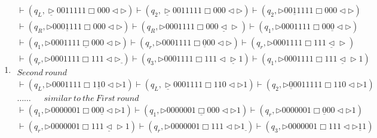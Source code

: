 \documentclass[12pt,a4paper]{article}
\makeatletter
\newtheorem*{solution}{Solution}
\theoremstyle{definition}
\renewenvironment{solution}[1][Solution] {\par\pushQED{\qed}\normalfont\topsep6\p@\@plus6\p@\relax\trivlist\item[\hskip\labelsep\bfseries#1\@addpunct{.}]\ignorespaces}{\popQED\endtrivlist\@endpefalse} \makeatother
\makeatother
\begin{document}
\begin{enumerate}
\begin{solution}
\begin{enumerate}
\begin{equation}
\begin{aligned}
	\vdash(q_L,\underline{\triangleright}  0 0    1  1  1  1  1 \Box 0  0  0    \triangleleft \triangleright )	\vdash(q_2,\underline{\triangleright}  0 0    1  1  1  1  1 \Box 0  0  0    \triangleleft \triangleright )	\vdash(q_2,\triangleright  0 0    \underline{1}  1  1  1  1 \Box 0  0  0    \triangleleft \triangleright )\\
		\vdash(q_R,\triangleright  0 0    0  \underline{1}  1  1  1 \Box 0  0  0    \triangleleft \triangleright )		\vdash(q_R,\triangleright  0 0    0  1  1  1  1 \Box 0  0  0    \underline{\triangleleft} \triangleright )		\vdash(q_1,\triangleright  0 0    0  1  1  1  1 \Box 0  0  \underline{0}    \triangleleft \triangleright )\\
	\vdash(q_1,\triangleright  0 0    0  1  1  1  1 \underline{\Box} 0  0  0    \triangleleft \triangleright )\vdash(q_r,\triangleright  0 0    0  1  1  1  1 \Box \underline{0}  0  0    \triangleleft \triangleright )\vdash(q_r,\triangleright  0 0    0  1  1  1  1 \Box 1 1 1    \underline{\triangleleft} \triangleright )\\
	\vdash(q_r,\triangleright  0 0 0  1  1  1  1 \Box 1 1 1    \triangleleft \triangleright \underline{~})\vdash(q_3,\triangleright  0 0 0  1  1  1  1 \Box 1 1 1    \triangleleft \underline{\triangleright} 1)\vdash(q_1,\triangleright  0 0 0  1  1  1  1 \Box 1 1 1    \underline{\triangleleft} \triangleright 1)\\
	Second~round~~~~~~~~~~~~~~~~~~~~~~~~~~~~~~~~~~~~~~~~~~~~~~~~~~~~~~~~~~~~~\\
	\vdash(q_L,\triangleright  0 0 0  1  1  1  1 \Box 1  \underline{1}  0    \triangleleft \triangleright 1)\vdash(q_L,\underline{\triangleright}  0 0 0  1  1  1  1 \Box 1  1  0    \triangleleft \triangleright 1)\vdash(q_2,\triangleright  \underline{0}  0 01  1  1  1  1 \Box 1  1  0    \triangleleft \triangleright 1)\\
	\dots\dots~~~~~~~similar~to~the~First~round~~~~~~~~~~~~~~~~~~~~~~~~~~~~~~~~~~~~~~~~~~~~\\
	\vdash(q_1,\triangleright  0 0 0  0  0  0  1 \Box 0  0 \underline{0}      \triangleleft \triangleright 1)\vdash(q_1,\triangleright  0 0 0  0  0  0  1 \underline{\Box} 0  0 0      \triangleleft \triangleright 1)\vdash(q_r,\triangleright  0 0 0  0  0  0  1 \Box \underline{0}  0 0  \triangleleft \triangleright 1)\\
	\vdash(q_r,\triangleright  0 0 0  0  0  0  1 \Box 1 1 1\underline{\triangleleft}\triangleright 1)\vdash(q_r,\triangleright  0 0 0  0  0  0  1 \Box 1 1 1\triangleleft\triangleright 1\underline{~})\vdash(q_3,\triangleright  0 0 0  0  0  0  1 \Box 1 1 1\triangleleft\triangleright \underline{1} 1)\\

\end{aligned}
\end{equation}
\end{enumerate}
\end{solution}
\end{enumerate}
\end{document}
